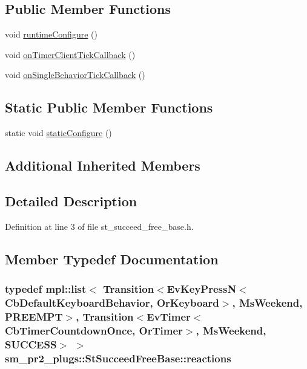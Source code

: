 \subsection*{Public Member Functions}
\begin{DoxyCompactItemize}
\item 
void \hyperlink{structsm__pr2__plugs_1_1StSucceedFreeBase_a90ef93147b370cf240d7800f1414648d}{runtime\+Configure} ()
\item 
void \hyperlink{structsm__pr2__plugs_1_1StSucceedFreeBase_a53328e9b7c378014ba1d19b835808582}{on\+Timer\+Client\+Tick\+Callback} ()
\item 
void \hyperlink{structsm__pr2__plugs_1_1StSucceedFreeBase_a18e063dd7dc924cd903824eaa2b680f7}{on\+Single\+Behavior\+Tick\+Callback} ()
\end{DoxyCompactItemize}
\subsection*{Static Public Member Functions}
\begin{DoxyCompactItemize}
\item 
static void \hyperlink{structsm__pr2__plugs_1_1StSucceedFreeBase_aeae400a9749af1efbe82e16b1b72529b}{static\+Configure} ()
\end{DoxyCompactItemize}
\subsection*{Additional Inherited Members}


\subsection{Detailed Description}


Definition at line 3 of file st\+\_\+succeed\+\_\+free\+\_\+base.\+h.



\subsection{Member Typedef Documentation}
\subsubsection[{\texorpdfstring{reactions}{reactions}}]{\setlength{\rightskip}{0pt plus 5cm}typedef mpl\+::list$<$ Transition$<$Ev\+Key\+PressN$<$Cb\+Default\+Keyboard\+Behavior, {\bf Or\+Keyboard}$>$, {\bf Ms\+Weekend}, {\bf P\+R\+E\+E\+M\+PT}$>$, Transition$<$Ev\+Timer$<$Cb\+Timer\+Countdown\+Once, {\bf Or\+Timer}$>$, {\bf Ms\+Weekend}, {\bf S\+U\+C\+C\+E\+SS}$>$ $>$ {\bf sm\+\_\+pr2\+\_\+plugs\+::\+St\+Succeed\+Free\+Base\+::reactions}}\hypertarget{structsm__pr2__plugs_1_1StSucceedFreeBase_a4f1039a06354ea339bc40adf26a8b0e6}{}\label{structsm__pr2__plugs_1_1StSucceedFreeBase_a4f1039a06354ea339bc40adf26a8b0e6}


